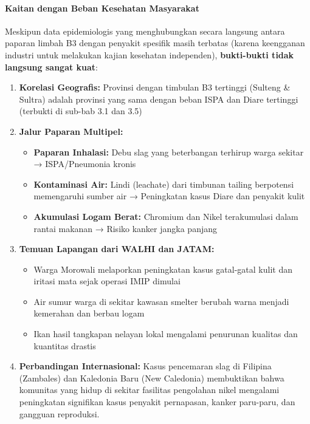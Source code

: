 \documentclass[
]{article}
\providecommand{\tightlist}{%
  \setlength{\itemsep}{0pt}\setlength{\parskip}{0pt}}
\begin{document}
\paragraph{Kaitan dengan Beban Kesehatan
Masyarakat}\label{kaitan-dengan-beban-kesehatan-masyarakat}

Meskipun data epidemiologis yang menghubungkan secara langsung antara
paparan limbah B3 dengan penyakit spesifik masih terbatas (karena
keengganan industri untuk melakukan kajian kesehatan independen),
\textbf{bukti-bukti tidak langsung sangat kuat}:

\begin{enumerate}
\def\labelenumi{\arabic{enumi}.}
\tightlist
\item
  \textbf{Korelasi Geografis:} Provinsi dengan timbulan B3 tertinggi
  (Sulteng \& Sultra) adalah provinsi yang sama dengan beban ISPA dan
  Diare tertinggi (terbukti di sub-bab 3.1 dan 3.5)
\item
  \textbf{Jalur Paparan Multipel:}

  \begin{itemize}
  \tightlist
  \item
    \textbf{Paparan Inhalasi:} Debu slag yang beterbangan terhirup warga
    sekitar → ISPA/Pneumonia kronis
  \item
    \textbf{Kontaminasi Air:} Lindi (leachate) dari timbunan tailing
    berpotensi memengaruhi sumber air → Peningkatan kasus Diare dan
    penyakit kulit
  \item
    \textbf{Akumulasi Logam Berat:} Chromium dan Nikel terakumulasi
    dalam rantai makanan → Risiko kanker jangka panjang
  \end{itemize}
\item
  \textbf{Temuan Lapangan dari WALHI dan JATAM:}

  \begin{itemize}
  \tightlist
  \item
    Warga Morowali melaporkan peningkatan kasus gatal-gatal kulit dan
    iritasi mata sejak operasi IMIP dimulai
  \item
    Air sumur warga di sekitar kawasan smelter berubah warna menjadi
    kemerahan dan berbau logam
  \item
    Ikan hasil tangkapan nelayan lokal mengalami penurunan kualitas dan
    kuantitas drastis
  \end{itemize}
\item
  \textbf{Perbandingan Internasional:} Kasus pencemaran slag di Filipina
  (Zambales) dan Kaledonia Baru (New Caledonia) membuktikan bahwa
  komunitas yang hidup di sekitar fasilitas pengolahan nikel mengalami
  peningkatan signifikan kasus penyakit pernapasan, kanker paru-paru,
  dan gangguan reproduksi.
\end{enumerate}
\end{document}
